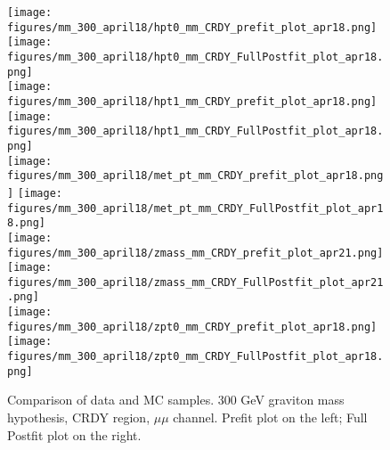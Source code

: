 \begin{figure}[H]
\begin{center}
\texttt{[image: figures/mm\_300\_april18/hpt0\_mm\_CRDY\_prefit\_plot\_apr18.png]}
\texttt{[image: figures/mm\_300\_april18/hpt0\_mm\_CRDY\_FullPostfit\_plot\_apr18.png]}\\
\texttt{[image: figures/mm\_300\_april18/hpt1\_mm\_CRDY\_prefit\_plot\_apr18.png]}
\texttt{[image: figures/mm\_300\_april18/hpt1\_mm\_CRDY\_FullPostfit\_plot\_apr18.png]}\\
\texttt{[image: figures/mm\_300\_april18/met\_pt\_mm\_CRDY\_prefit\_plot\_apr18.png]}
\texttt{[image: figures/mm\_300\_april18/met\_pt\_mm\_CRDY\_FullPostfit\_plot\_apr18.png]}\\
\texttt{[image: figures/mm\_300\_april18/zmass\_mm\_CRDY\_prefit\_plot\_apr21.png]}
\texttt{[image: figures/mm\_300\_april18/zmass\_mm\_CRDY\_FullPostfit\_plot\_apr21.png]}\\
\texttt{[image: figures/mm\_300\_april18/zpt0\_mm\_CRDY\_prefit\_plot\_apr18.png]}
\texttt{[image: figures/mm\_300\_april18/zpt0\_mm\_CRDY\_FullPostfit\_plot\_apr18.png]}\\
\caption[Data-MC comparison in CRDY, other variables.]{Comparison of data and MC samples. 300 GeV graviton mass hypothesis, CRDY region, $\mu\mu$ channel. Prefit plot on the left; Full Postfit plot on the right.}
\label{MCcomparisons_mm_low_CRDY_2}
\end{center}
\end{figure}

